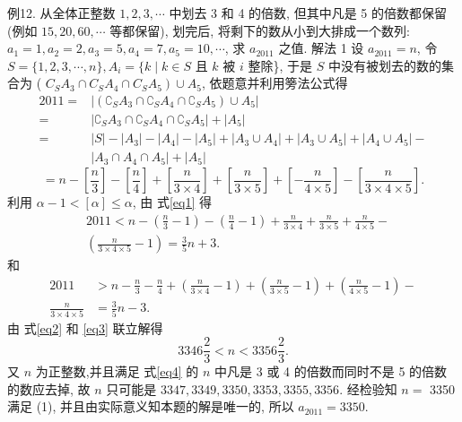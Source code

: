 例12. 从全体正整数 $1,2,3, \cdots$ 中划去 3 和 4 的倍数, 但其中凡是 5 的倍数都保留 (例如 $15,20,60, \cdots$ 等都保留), 划完后, 将剩下的数从小到大排成一个数列: $a_1=1, a_2=2, a_3=5, a_4=7, a_5=10, \cdots$, 求 $a_{2011}$ 之值.
解法 1 设 $a_{2011}=n$, 令 $S=\{1,2,3, \cdots, n\}, A_i=\{k \mid k \in S$ 且 $k$ 被 $i$ 整除\}, 于是 $S$ 中没有被划去的数的集合为 ( $\left.C_S A_3 \cap C_S A_4 \cap C_S A_5\right) \cup A_5$, 依题意并利用篣法公式得
$$
\begin{aligned}
2011= & \left|\left(\complement_S A_3 \cap \complement_S A_4 \cap \complement_S A_5\right) \cup A_5\right| \\
= & \left|\complement_S A_3 \cap \complement_S A_4 \cap \complement_S A_5\right|+\left|A_5\right| \\
= & |S|-\left|A_3\right|-\left|A_4\right|-\left|A_5\right|+\left|A_3 \cup A_4\right|+\left|A_3 \cup A_5\right|+\left|A_4 \cup A_5\right|- \\
& \left|A_3 \cap A_4 \cap A_5\right|+\left|A_5\right|
\end{aligned}
$$
$$
=n-\left[\frac{n}{3}\right]-\left[\frac{n}{4}\right]+\left[\frac{n}{3 \times 4}\right]+\left[\frac{n}{3 \times 5}\right]+\left[-\frac{n}{4 \times 5}\right]-\left[\frac{n}{3 \times 4 \times 5}\right] .\label{eq1}
$$
利用 $\alpha-1<[\alpha] \leqslant \alpha$, 由 式\ref{eq1} 得
$$
\begin{aligned}
& 2011<n-\left(\frac{n}{3}-1\right)-\left(\frac{n}{4}-1\right)+\frac{n}{3 \times 4}+\frac{n}{3 \times 5}+\frac{n}{4 \times 5}- \\
& \left(\frac{n}{3 \times 4 \times 5}-1\right)=\frac{3}{5} n+3 . \label{eq2}
\end{aligned}
$$
和
$$
\begin{aligned}
2011 & >n-\frac{n}{3}-\frac{n}{4}+\left(\frac{n}{3 \times 4}-1\right)+\left(\frac{n}{3 \times 5}-1\right)+\left(\frac{n}{4 \times 5}-1\right)- \\
\frac{n}{3 \times 4 \times 5} & =\frac{3}{5} n-3 . \label{eq3}
\end{aligned}
$$
由 式\ref{eq2} 和 \ref{eq3} 联立解得
$$
3346 \frac{2}{3}<n<3356 \frac{2}{3} . \label{eq4}
$$
又 $n$ 为正整数,并且满足 式\ref{eq4} 的 $n$ 中凡是 3 或 4 的倍数而同时不是 5 的倍数的数应去掉, 故 $n$ 只可能是 $3347,3349,3350,3353,3355,3356$. 经检验知 $n=$ 3350 满足 (1), 并且由实际意义知本题的解是唯一的, 所以 $a_{2011}=3350$.



